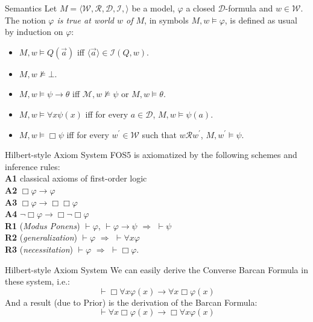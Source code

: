 \documentclass{beamer}
\theoremstyle{definition}
\newcommand{\D}{\mathcal{D}}
\newcommand{\W}{\mathcal{W}}
\newcommand{\R}{\mathcal{R}}
\newcommand{\M}{\mathcal{M}}
\newcommand{\I}{\mathcal{I}}
\newcommand{\Kmodel}{\bl\W,\R,\D,\I,\br}
\newcommand{\p}{^{\prime}}
\newcommand{\nmodels}{\not\models}
\newcommand{\nao}{\neg}
\newcommand{\impli}{\rightarrow}
\newcommand{\todo}{\forall}
\newcommand{\teo}{\vdash}
\newcommand{\bl}{\langle}
\newcommand{\br}{\rangle}
\begin{document}
\begin{frame}{Semantics} 
	Let $M = \Kmodel$ be a model, $\varphi$ a closed $\D$-formula and $w \in \W$. The notion \textit{$\varphi$ is true at world $w$ of $M$}, in symbols $M,w \models \varphi$, is defined as usual by induction on $\varphi$: 
	\begin{itemize} 
		\item $M,w \models Q(\vec{a})$ iff $\bl \vec{a}\br \in \I(Q,w)$. 
		\item $M,w \nmodels \bot$. 
		\item $M,w \models \psi \impli \theta$ iff $\M,w \nmodels \psi$ or $M,w \models \theta$.
		\item $M,w \models \todo x \psi(x)$ iff for every $a \in \D$, $M,w \models \psi(a)$.
		\item $M,w \models \Box \psi$ iff for every $w\p \in \W$ such that $w\R w\p$, $M,w\p \models \psi$.
	\end{itemize}
\end{frame}


	
\begin{frame}{Hilbert-style Axiom System}
\qquad FOS5 is axiomatized by the following schemes and inference rules:\\
 \vspace{5 mm}
	\textbf{A1} classical axioms of first-order logic\\
	\textbf{A2} $\Box \varphi \impli \varphi$\\
	\textbf{A3} $\Box \varphi \impli \Box \Box \varphi$\\
	\textbf{A4} $\nao \Box \varphi \impli \Box \nao \Box \varphi$\\
	\textbf{R1} (\textit{Modus Ponens}) $\teo \varphi$, $\teo \varphi\impli\psi$ $\Rightarrow$ $\teo \psi$ \\
	\textbf{R2} (\textit{generalization})  $\teo \varphi$ $\Rightarrow$ $\teo \todo x \varphi$ \\
	\textbf{R3} (\textit{necessitation})  $\teo \varphi$ $\Rightarrow$  $\teo \Box \varphi$.\\
\end{frame}
	

\begin{frame}{Hilbert-style Axiom System}
\qquad We can easily derive the Converse Barcan Formula in these system, i.e.:\\
$$\teo \Box \todo x\varphi(x) \impli \todo x \Box\varphi(x)$$
\qquad And a result (due to Prior) is the derivation of the Barcan Formula:\\
$$\teo \todo x \Box \varphi(x) \impli \Box \todo x \varphi(x)$$
\end{frame}
\end{document}
